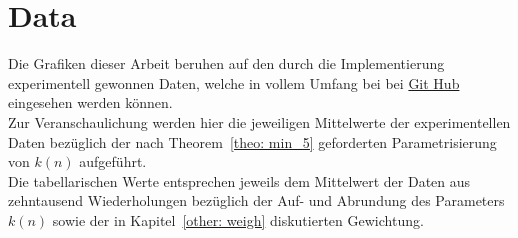 \section{Data}		%

Die Grafiken dieser Arbeit beruhen auf den durch die Implementierung experimentell gewonnen Daten, welche in vollem Umfang bei bei \href{https://github.com/jfklorenz}{Git Hub} eingesehen werden können.\\[.05cm]
Zur Veranschaulichung werden hier die jeweiligen Mittelwerte der experimentellen Daten bezüglich der nach Theorem~\ref{theo: min_5} geforderten Parametrisierung von $k(n)$ aufgeführt.\\[.05cm]
Die tabellarischen Werte entsprechen jeweils dem Mittelwert der Daten aus zehntausend Wiederholungen bezüglich der Auf- und Abrundung des Parameters $k(n)$ sowie der in Kapitel~\ref{other: weigh} diskutierten Gewichtung.



























